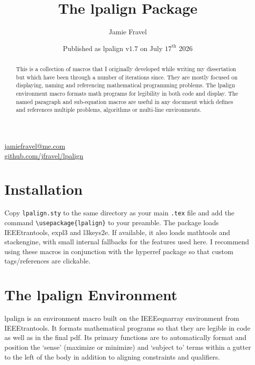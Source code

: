 \documentclass{article}
\title{The \textsf{lpalign} Package}
\date{Published as \textsf{lpalign} v$1.7$ on July $17^\textrm{th}$ 2026}
\author{Jamie Fravel}
\begin{document}
\maketitle
\begin{center}
\href{mailto:jamiefravel@me.com}{jamiefravel@me.com} \\
\href{https://github.com/jfravel/lpalign}{github.com/jfravel/lpalign}
\end{center}
\begin{abstract}
    This is a collection of macros that I originally developed while writing my dissertation but which have been through a number of iterations since. They are mostly focused on displaying, naming and referencing mathematical programming problems. The \textsf{lpalign} environment macro formats math programs for legibility in both code and display. The named paragraph and sub-equation macros are useful in any document which defines and references multiple problems, algorithms or multi-line environments.
\end{abstract}


\tableofcontents
\newpage
{} %
\setcounter{page}{1}

\section{Installation}

Copy \verb|lpalign.sty| to the same directory as your main \verb|.tex| file and add the command \verb|\usepackage{lpalign}| to your preamble. The package loads \textsf{IEEEtrantools}, \textsf{expl3} and \textsf{l3keys2e}. If available, it also loads \textsf{mathtools} and \textsf{stackengine}, with small internal fallbacks for the features used here. I recommend using these macros in conjunction with the \textsf{hyperref} package so that custom tags/references are clickable.




\section{The \textsf{lpalign} Environment}\label{sec:lpalign}

\textsf{lpalign} is an environment macro built on the \textsf{IEEEeqnarray} environment from \textsf{IEEEtrantools}. It formats mathematical programs so that they are legible in code as well as in the final pdf. Its primary functions are to automatically format and position the `sense' (maximize or minimize) and `subject to' terms within a gutter to the left of the body in addition to aligning constraints and qualifiers.
\end{document}
